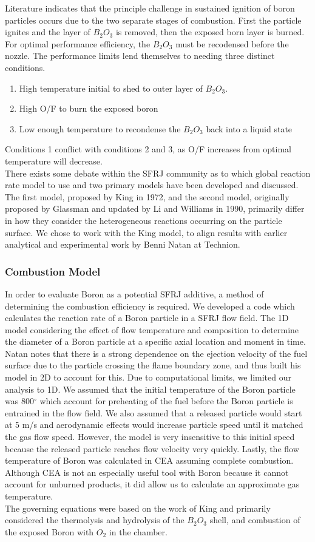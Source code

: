 Literature indicates that the principle challenge in sustained ignition of boron particles occurs due to the two separate stages of combustion. First the particle ignites and the layer of $B_2O_3$ is removed, then the exposed born layer is burned. For optimal performance efficiency, the $B_2O_3$ must be recodensed before the nozzle. The performance limits lend themselves to needing three distinct conditions.
\begin{enumerate}
    \item High temperature initial to shed to outer layer of $B_2O_3$.
    \item High O/F to burn the exposed boron
    \item Low enough temperature to recondense the $B_2O_3$ back into a liquid state
\end{enumerate}
Conditions 1 conflict with conditions 2 and 3, as O/F increases from optimal temperature will decrease. \\ \indent
There exists some debate within the SFRJ community as to which global reaction rate model to use and two primary models have been developed and discussed. The first model, proposed by King in 1972, and the second model, originally proposed by Glassman and updated by Li and Williams in 1990, primarily differ in how they consider the heterogeneous reactions occurring on the particle surface. We chose to work with the King model, to align results with earlier analytical and experimental work by Benni Natan at Technion.
\subsubsection{Combustion Model}
In order to evaluate Boron as a potential SFRJ additive, a method of determining the combustion efficiency is required. We developed a code which calculates the reaction rate of a Boron particle in a SFRJ flow field. The 1D model considering the effect of flow temperature and composition to determine the diameter of a Boron particle at a specific axial location and moment in time. \\ \indent
Natan notes that there is a strong dependence on the ejection velocity of the fuel surface due to the particle crossing the flame boundary zone, and thus built his model in 2D to account for this. Due to computational limits, we limited our analysis to 1D. We assumed that the initial temperature of the Boron particle was 800$^{\circ}$ which account for preheating of the fuel before the Boron particle is entrained in the flow field. We also assumed that a released particle would start at 5 m/s and aerodynamic effects would increase particle speed until it matched the gas flow speed. However, the model is very insensitive to this initial speed because the released particle reaches flow velocity very quickly. Lastly, the flow temperature of Boron was calculated in CEA assuming complete combustion. Although CEA is not an especially useful tool with Boron because it cannot account for unburned products, it did allow us to calculate an approximate gas temperature. \\ \indent
The governing equations were based on the work of King and primarily considered the thermolysis and hydrolysis of the $B_2O_3$ shell, and combustion of the exposed Boron with $O_2$ in the chamber. 
